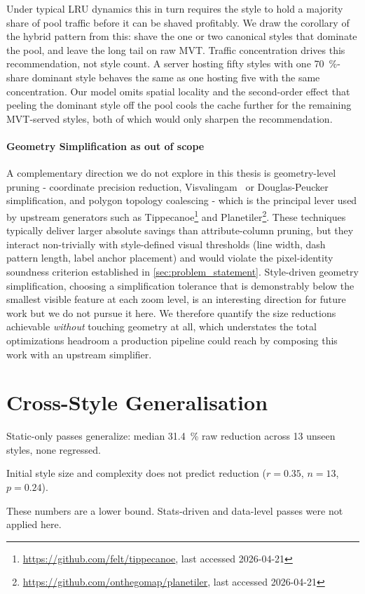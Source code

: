 Under typical \ac{LRU} dynamics this in turn requires the style to hold a majority share of pool traffic before it can be shaved profitably.
We draw the corollary of the hybrid pattern from this:
shave the one or two canonical styles that dominate the pool, and leave the long tail on raw \ac{MVT}.
Traffic concentration drives this recommendation, not style count.
A server hosting fifty styles with one \qty{70}{\percent}-share dominant style behaves the same as one hosting five with the same concentration.
Our model omits spatial locality and the second-order effect that peeling the dominant style off the pool cools the cache further for the remaining \ac{MVT}-served styles, both of which would only sharpen the recommendation.

\paragraph{Geometry Simplification as out of scope}
A complementary direction we do not explore in this thesis is geometry-level pruning - coordinate precision reduction, Visvalingam~\cite{visvalingamLineGeneralisationRepeated1993} or Douglas-Peucker~\cite{douglasALGORITHMSREDUCTIONNUMBER1973} simplification, and polygon topology coalescing - which is the principal lever used by upstream generators such as Tippecanoe\footnote{\url{https://github.com/felt/tippecanoe}, last accessed 2026-04-21} and Planetiler\footnote{\url{https://github.com/onthegomap/planetiler}, last accessed 2026-04-21}.
These techniques typically deliver larger absolute savings than attribute-column pruning, but they interact non-trivially with style-defined visual thresholds (line width, dash pattern length, label anchor placement) and would violate the pixel-identity soundness criterion established in \cref{sec:problem_statement}.
Style-driven geometry simplification, choosing a simplification tolerance that is demonstrably below the smallest visible feature at each zoom level, is an interesting direction for future work but we do not pursue it here.
We therefore quantify the size reductions achievable \emph{without} touching geometry at all, which understates the total optimizations headroom a production pipeline could reach by composing this work with an upstream simplifier.

\section{Cross-Style Generalisation}\label{sec:exp_cross_style}
\begin{keytakeaways}
\item Static-only passes generalize: median \qty{31.4}{\percent} raw reduction across 13 unseen styles, none regressed.
\item Initial style size and complexity does not predict reduction ($r = 0.35$, $n = 13$, $p = 0.24$).
\item These numbers are a lower bound.
Stats-driven and data-level passes were not applied here.
\end{keytakeaways}

